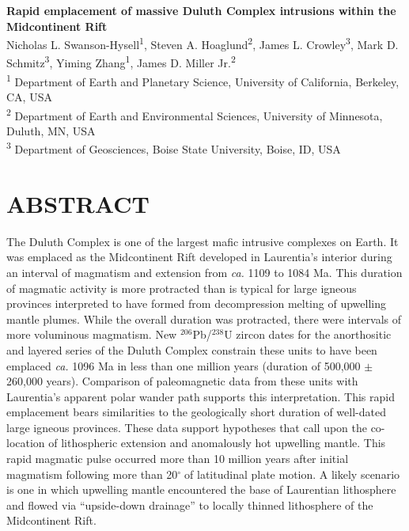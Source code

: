 \documentclass[11pt,letterpaper]{article}
\begin{document}
\begin{flushleft}
{\Large \textbf{Rapid emplacement of massive Duluth Complex intrusions within the Midcontinent Rift}}
\\
Nicholas L. Swanson-Hysell\textsuperscript{1}, Steven A. Hoaglund\textsuperscript{2}, James L. Crowley\textsuperscript{3}, Mark D. Schmitz\textsuperscript{3}, Yiming Zhang\textsuperscript{1}, James D. Miller Jr.\textsuperscript{2}
\\
\bigskip
\textsuperscript{1} Department of Earth and Planetary Science, University of California, Berkeley, CA, USA\\
\textsuperscript{2} Department of Earth and Environmental Sciences, University of Minnesota, Duluth, MN, USA \\
\textsuperscript{3} Department of Geosciences, Boise State University, Boise, ID, USA
\bigskip
\end{flushleft}

\linenumbers

\section*{ABSTRACT}

The Duluth Complex is one of the largest mafic intrusive complexes on Earth. It was emplaced as the Midcontinent Rift developed in Laurentia's interior during an interval of magmatism and extension from \textit{ca.} 1109 to 1084 Ma. This duration of magmatic activity is more protracted than is typical for large igneous provinces interpreted to have formed from decompression melting of upwelling mantle plumes. While the overall duration was protracted, there were intervals of more voluminous magmatism. New $^{206}$Pb/$^{238}$U zircon dates for the anorthositic and layered series of the Duluth Complex constrain these units to have been emplaced \textit{ca.} 1096 Ma in less than one million years (duration of 500,000 $\pm$ 260,000 years). Comparison of paleomagnetic data from these units with Laurentia's apparent polar wander path supports this interpretation. This rapid emplacement bears similarities to the geologically short duration of well-dated large igneous provinces. These data support hypotheses that call upon the co-location of lithospheric extension and anomalously hot upwelling mantle. This rapid magmatic pulse occurred more than 10 million years after initial magmatism following more than 20$^{\circ}$$\;$of latitudinal plate motion. A likely scenario is one in which upwelling mantle encountered the base of Laurentian lithosphere and flowed via ``upside-down drainage'' to locally thinned lithosphere of the Midcontinent Rift.
\end{document}
